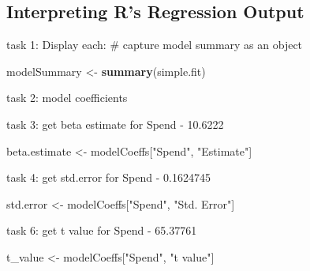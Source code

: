 \documentclass[
]{article}
\newenvironment{Shaded}{\begin{snugshade}}{\end{snugshade}}
\newcommand{\FunctionTok}[1]{\textcolor[rgb]{0.13,0.29,0.53}{\textbf{#1}}}
\newcommand{\NormalTok}[1]{#1}
\newcommand{\OtherTok}[1]{\textcolor[rgb]{0.56,0.35,0.01}{#1}}
\newcommand{\SpecialCharTok}[1]{\textcolor[rgb]{0.81,0.36,0.00}{\textbf{#1}}}
\newcommand{\StringTok}[1]{\textcolor[rgb]{0.31,0.60,0.02}{#1}}
\begin{document}
\hypertarget{interpreting-rs-regression-output}{%
\subsection{Interpreting R's Regression
Output}\label{interpreting-rs-regression-output}}

task 1: Display each: \# capture model summary as an object

\begin{Shaded}
\begin{Highlighting}[]
\NormalTok{modelSummary }\OtherTok{\textless{}{-}} \FunctionTok{summary}\NormalTok{(simple.fit) }
\end{Highlighting}
\end{Shaded}

task 2: model coefficients

\begin{Shaded}
\end{Shaded}

task 3: get beta estimate for Spend - 10.6222

\begin{Shaded}
\begin{Highlighting}[]
\NormalTok{beta.estimate }\OtherTok{\textless{}{-}}\NormalTok{ modelCoeffs[}\StringTok{"Spend"}\NormalTok{, }\StringTok{"Estimate"}\NormalTok{] }
\end{Highlighting}
\end{Shaded}

task 4: get std.error for Spend - 0.1624745

\begin{Shaded}
\begin{Highlighting}[]
\NormalTok{std.error }\OtherTok{\textless{}{-}}\NormalTok{ modelCoeffs[}\StringTok{"Spend"}\NormalTok{, }\StringTok{"Std. Error"}\NormalTok{]}
\end{Highlighting}
\end{Shaded}

task 6: get t value for Spend - 65.37761

\begin{Shaded}
\begin{Highlighting}[]
\NormalTok{t\_value }\OtherTok{\textless{}{-}}\NormalTok{ modelCoeffs[}\StringTok{"Spend"}\NormalTok{, }\StringTok{"t value"}\NormalTok{]}
\end{Highlighting}
\end{Shaded}
\end{document}
